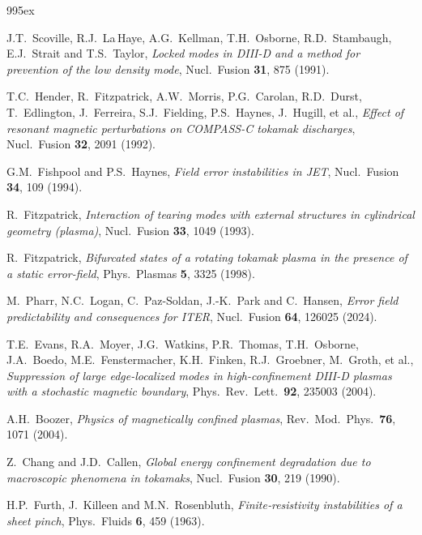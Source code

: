 \documentclass[12pt,prb,aps]{revtex4-1}
\begin{document}
\begin{thebibliography}{99}\baselineskip 5ex

 J.T.~Scoville, R.J.~La\,Haye, A.G.~Kellman, T.H.~Osborne, R.D.~Stambaugh, E.J.~Strait and T.S.~Taylor, {\em Locked modes in DIII-D and a method for prevention of the low density mode}, Nucl.\ Fusion {\bf 31}, 875 (1991).

 T.C.~Hender, R.~Fitzpatrick, A.W.~Morris,  P.G.~Carolan, R.D.~Durst,
T.~Edlington, J.~Ferreira, S.J.~Fielding, P.S.~Haynes, J.~Hugill, et al., {\em Effect of resonant magnetic perturbations on COMPASS-C tokamak discharges}, Nucl.\ Fusion {\bf 32}, 2091 (1992).

 G.M.~Fishpool and P.S.~Haynes, {\em Field error instabilities in JET}, Nucl.\ Fusion {\bf 34}, 109 (1994).

 R.~Fitzpatrick, {\em Interaction of tearing modes with external structures in cylindrical geometry (plasma)}, Nucl.\ Fusion {\bf 33}, 1049 (1993).

 R.~Fitzpatrick, {\em Bifurcated states of a rotating tokamak plasma in the presence of a static error-field}, Phys.\ Plasmas {\bf 5}, 3325 (1998).

 M.~Pharr, N.C.~Logan, C.~Paz-Soldan, J.-K.~Park and C.~Hansen, {\em Error field predictability and consequences for ITER}, Nucl.\ Fusion {\bf 64}, 126025 (2024).

 T.E.~Evans, R.A.~Moyer, J.G.~Watkins, P.R.~Thomas, T.H.~Osborne, 
J.A.~Boedo, M.E.~Fenstermacher, K.H.~Finken, R.J.~Groebner, M.~Groth, et al., {\em Suppression of large edge-localized modes in high-confinement DIII-D plasmas with a stochastic magnetic boundary},  Phys.\ Rev.\ Lett.\ {\bf 92}, 235003 (2004).

 A.H.~Boozer, {\em Physics of magnetically confined plasmas}, Rev.\ Mod.\ Phys.\ {\bf 76}, 1071 (2004).

  Z.~Chang and J.D.~Callen, {\em Global energy confinement degradation due to macroscopic phenomena in tokamaks}, Nucl.\ Fusion {\bf 30}, 219 (1990).

 H.P.~Furth, J.~Killeen and M.N.~Rosenbluth, {\em Finite‐resistivity instabilities of a sheet pinch}, Phys.\ Fluids {\bf 6}, 459 (1963).


\end{thebibliography}
\end{document}
